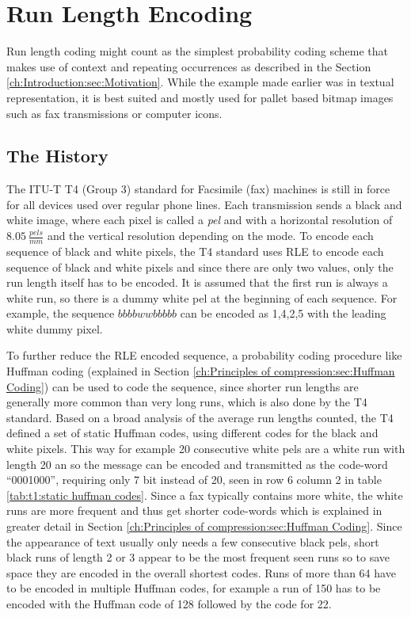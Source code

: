 \section{Run Length Encoding}
\label{ch:Principles of compression:sec:Run Length Encoding}
\par{
	Run length coding might count as the simplest probability coding scheme that makes use of context and repeating occurrences as described in the Section \ref{ch:Introduction:sec:Motivation}. While the example made earlier was in textual representation, it is best suited and mostly used for pallet based bitmap images \cite{palette-image} such as fax transmissions or computer icons.
}

\subsection{The History}
\label{ch:Principles of compression:sec:Run Length Encoding:subSec:History}
\par{
 The ITU-T T4 (Group 3) standard for Facsimile (fax) machines \cite{ITU} is still in force for all devices used over regular phone lines. Each transmission sends a black and white image, where each pixel is called a \textit{pel} and with a horizontal resolution of $8.05 \: \frac{pels}{mm}$ and the vertical resolution depending on the mode. To encode each sequence of black and white pixels, the T4 standard uses RLE to encode each sequence of black and white pixels and since there are only two values, only the run length itself has to be encoded. It is assumed that the first run is always a white run, so there is a dummy white pel at the beginning of each sequence. For example, the sequence $bbbbwwbbbbb$ can be encoded as 1,4,2,5 with the leading white dummy pixel.
}
\par{
To further reduce the RLE encoded sequence, a probability coding procedure like Huffman coding (explained in Section \ref{ch:Principles of compression:sec:Huffman Coding}) can be used to code the sequence, since shorter run lengths are generally more common than very long runs, which is also done by the T4 standard. Based on a broad analysis of the average run lengths counted, the T4 defined a set of static Huffman codes, using different codes for the black and white pixels. This way for example 20 consecutive white pels  are a white run with length 20 an so the message can be encoded and transmitted as the code-word \enquote{0001000}, requiring only 7 bit instead of 20, seen in row 6 column 2 in table \ref{tab:t1:static huffman codes}. Since a fax typically contains more white, the white runs are more frequent and thus get shorter code-words which is explained in greater detail in Section \ref{ch:Principles of compression:sec:Huffman Coding}. Since the appearance of text usually only needs a few consecutive black pels, short black runs of length 2 or 3 appear to be the most frequent seen runs so to save space they are encoded in the overall shortest codes. Runs of more than 64 have to be encoded in multiple Huffman codes, for example a run of 150 has to be encoded with the Huffman code of 128 followed by the code for 22.
}
